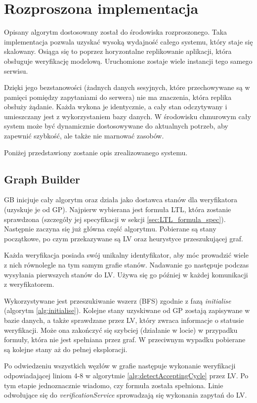\chapter{Rozproszona implementacja}

Opisany algorytm dostosowany został do środowiska rozproszonego.
Taka implementacja pozwala uzyskać wysoką wydajność całego systemu, który staje się skalowany.
Osiąga się to poprzez horyzontalne replikowanie aplikacji, która obsługuje weryfikację modelową.
Uruchomione zostaje wiele instancji tego samego serwisu.

Dzięki jego bezstanowości (żadnych danych sesyjnych, które przechowywane są w pamięci pomiędzy zapytaniami do serwera) nie ma znaczenia, która replika obsłuży żądanie.
Każda wykona je identycznie, a cały stan odczytywany i umieszczany jest z wykorzystaniem bazy danych.
W środowisku chmurowym cały system może być dynamicznie dostosowywane do aktualnych potrzeb, aby zapewnić szybkość, ale także nie marnować zasobów.

Poniżej przedstawiony zostanie opis zrealizowanego systemu.


\section{Graph Builder}

GB inicjuje cały algorytm oraz działa jako dostawca stanów dla weryfikatora (uzyskuje je od GP).
Najpierw wybierana jest formuła LTL, która zostanie sprawdzona (szczegóły jej specyfikacji w sekcji \ref{sec:LTL_formula_spec}).
Następnie zaczyna się już główna część algorytmu.
Pobierane są stany początkowe, po czym przekazywane są LV oraz heurystyce przeszukującej graf.

Każda weryfikacja posiada swój unikalny identyfikator, aby móc prowadzić wiele z nich równolegle na tym samym grafie stanów.
Nadawanie go następuje podczas wysyłania pierwszych stanów do LV.
Używa się go później w każdej komunikacji z weryfikatorem.

Wykorzystywane jest przeszukiwanie wszerz (BFS) zgodnie z fazą \textit{initialise} (algorytm \ref{alg:initialise}).
Kolejne stany uzyskiwane od GP zostają zapisywane w bazie danych, a także sprawdzane przez LV, który zwraca informacje o statusie weryfikacji.
Może ona zakończyć się szybciej (działanie w locie) w przypadku formuły, która nie jest spełniana przez graf.
W przeciwnym wypadku pobierane są kolejne stany aż do pełnej eksploracji.

Po odwiedzeniu wszystkich węzłów w grafie następuje wykonanie weryfikacji odpowiadającej liniom 4-8 w algorytmie \ref{alg:detectAcceptingCycle} przez LV.
Po tym etapie jednoznacznie wiadomo, czy formuła została spełniona.
Linie odwołujące się do \textit{verificationService} sprowadzają się wykonania zapytań do LV.

